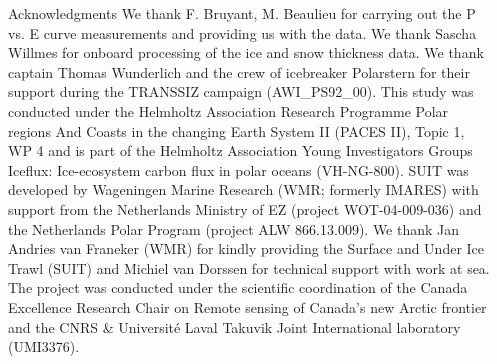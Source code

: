 \documentclass[final]{beamer}
\newlength{\sepwidth}
\newlength{\colwidth}
\newcommand{\separatorcolumn}{\begin{column}{\sepwidth}\end{column}}
\begin{document}
\begin{frame}[t]
\begin{columns}[t]
\begin{column}{\colwidth}
			\vspace{-3.0cm}
			\begin{block}{\small Acknowledgments}
				\footnotesize{We thank F. Bruyant, M. Beaulieu for carrying out the P vs. E curve measurements and providing us with the data. We thank Sascha Willmes for onboard processing of the ice and snow thickness data. We thank captain Thomas Wunderlich and the crew of icebreaker Polarstern for their support during the TRANSSIZ campaign (AWI\_PS92\_00). This study was conducted under the Helmholtz Association Research Programme Polar regions And Coasts in the changing Earth System II (PACES II), Topic 1, WP 4 and is part of the Helmholtz Association Young Investigators Groups Iceflux: Ice-ecosystem carbon flux in polar oceans (VH-NG-800). SUIT was developed by Wageningen Marine Research (WMR; formerly IMARES) with support from the Netherlands Ministry of EZ (project WOT-04-009-036) and the Netherlands Polar Program (project ALW 866.13.009). We thank Jan Andries van Franeker (WMR) for kindly providing the Surface and Under Ice Trawl (SUIT) and Michiel van Dorssen for technical support with work at sea. The project was conducted under the scientific coordination of the Canada Excellence Research Chair on Remote sensing of Canada's new Arctic frontier and the CNRS \& Université Laval Takuvik Joint International laboratory (UMI3376).}
			\end{block}
		\end{column}

		\separatorcolumn
	\end{columns}
\end{frame}
\end{document}
